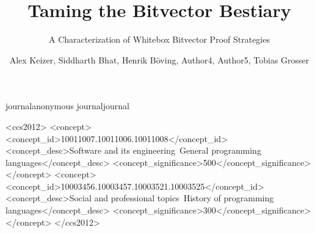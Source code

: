 \documentclass[review, sigplan]{acmart}
\def\acmversionanonymous{anonymous}
\def\acmversionjournal{journal}
\def\acmversion{anonymous}
\def\acmversion{journal}
\begin{document}
\title{Taming the Bitvector Bestiary}
\subtitle{A Characterization of Whitebox Bitvector Proof Strategies}

\author{Alex Keizer, Siddharth Bhat, Henrik B{\"o}ving, Author4, Author5, Tobias Grosser}

\begin{abstract}

\end{abstract}

\ifx\acmversion\acmversionanonymous
{} %
\renewcommand\footnotetextcopyrightpermission[1]{} %
\fi
\ifx\acmversion\acmversionjournal
\begin{CCSXML}
<ccs2012>
<concept>
<concept_id>10011007.10011006.10011008</concept_id>
<concept_desc>Software and its engineering~General programming languages</concept_desc>
<concept_significance>500</concept_significance>
</concept>
<concept>
<concept_id>10003456.10003457.10003521.10003525</concept_id>
<concept_desc>Social and professional topics~History of programming languages</concept_desc>
<concept_significance>300</concept_significance>
</concept>
</ccs2012>
\end{CCSXML}
\end{document}
